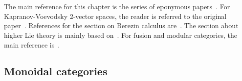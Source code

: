 \chapter{}\label{chapter:hda}

    The main reference for this chapter is the series of eponymous papers~\citep{baez_higher-dimensional_2003, baez_higher-dimensional_2003-1}. For Kapranov-Voevodsky 2-vector spaces, the reader is referred to the original paper~\citet{kapranov_2-categories_1994}. References for the section on Berezin calculus are~\citet{losev_berezin_2007, choquet-bruhat_analysis_2000}. The section about higher Lie theory is mainly based on~\citet{fiorenza_introduction_2004}. For fusion and modular categories, the main reference is~\citet{etingof_tensor_2016}.

\section{Monoidal categories}\label{section:monoidal_categories}


